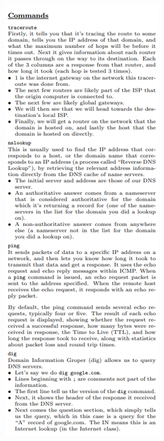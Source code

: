 \documentclass[12pt, landscape]{article}
\begin{document}
\begin{multicols*}{3}
\centerline{\includegraphics[width=0.90\linewidth]{command1}}

\end{multicols*}
\end{document}
